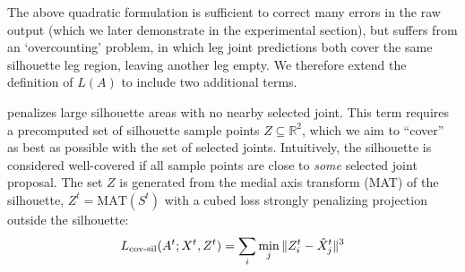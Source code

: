 The above quadratic formulation is sufficient to correct many errors in the raw output (which we later demonstrate in the experimental section), but suffers from an `overcounting' problem, in which leg joint predictions both cover the same silhouette leg region, leaving another leg empty. We therefore extend the definition of $L(A)$ to include two additional terms. 

\def\silhouette{S}

 penalizes large silhouette areas with no nearby selected joint. This term requires a precomputed set of silhouette sample points $Z \subseteq \mathbb{R}^2$, which we aim to ``cover'' as best as possible with the set of selected joints. Intuitively, the silhouette is considered well-covered if all sample points are close to \emph{some} selected joint proposal. The set $Z$ is generated from the medial axis transform (MAT)\cite{blum1967transformation} of the silhouette, $Z^{t} = \text{MAT}(\silhouette^{t})$
with a cubed loss strongly penalizing projection outside the silhouette:
\begin{equation}
L_{\textrm{cov-sil}}(A^{t};X^{t},Z^{t}) = \sum_{i}\min_{j}\|Z_{i}^{t} - \hat{X}_{j}^{t}\|^3
\end{equation}

